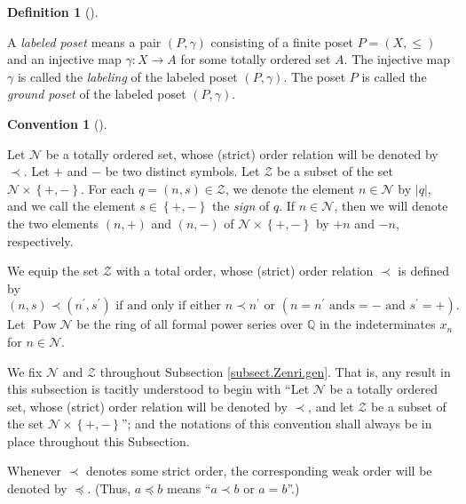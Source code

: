 \documentclass[numbers=enddot,12pt,final,onecolumn,notitlepage]{scrartcl}%
\theoremstyle{definition}
\newtheorem{defi}[theo]{Definition}
\newenvironment{definition}[1][]
{\begin{defi}[#1]\begin{leftbar}}
{\end{leftbar}\end{defi}}
\newtheorem{conv}[theo]{Convention}
\newenvironment{convention}[1][]
{\begin{conv}[#1]\begin{leftbar}}
{\end{leftbar}\end{conv}}
\newenvironment{convention}[1][Convention]{\noindent\textbf{#1.} }{\ \rule{0.5em}{0.5em}}
\begin{document}
\begin{definition}
A \textit{labeled poset} means a pair $\left(  P,\gamma\right)  $ consisting
of a finite poset $P=\left(  X,\leq\right)  $ and an injective map
$\gamma:X\rightarrow A$ for some totally ordered set $A$. The injective map
$\gamma$ is called the \textit{labeling} of the labeled poset $\left(
P,\gamma\right)  $. The poset $P$ is called the \textit{ground poset} of the
labeled poset $\left(  P,\gamma\right)  $.
\end{definition}

\begin{convention}
Let $\mathcal{N}$ be a totally ordered set, whose (strict) order relation will
be denoted by $\prec$. Let $+$ and $-$ be two distinct symbols. Let
$\mathcal{Z}$ be a subset of the set $\mathcal{N}\times\left\{  +,-\right\}
$. For each $q=\left(  n,s\right)  \in\mathcal{Z}$, we denote the element
$n\in\mathcal{N}$ by $\left\vert q\right\vert $, and we call the element
$s\in\left\{  +,-\right\}  $ the \textit{sign} of $q$. If $n\in\mathcal{N}$,
then we will denote the two elements $\left(  n,+\right)  $ and $\left(
n,-\right)  $ of $\mathcal{N}\times\left\{  +,-\right\}  $ by $+n$ and $-n$, respectively.

We equip the set $\mathcal{Z}$ with a total order, whose (strict) order
relation $\prec$ is defined by%
\[
\left(  n,s\right)  \prec\left(  n^{\prime},s^{\prime}\right)  \text{ if and
only if either }n\prec n^{\prime}\text{ or }\left(  n=n^{\prime}\text{ and
}s=-\text{ and }s^{\prime}=+\right)  .
\]
Let $\operatorname*{Pow}\mathcal{N}$ be the ring of all formal power series
over $\mathbb{Q}$ in the indeterminates $x_{n}$ for $n\in\mathcal{N}$.

We fix $\mathcal{N}$ and $\mathcal{Z}$ throughout Subsection
\ref{subsect.Zenri.gen}. That is, any result in this subsection is tacitly
understood to begin with \textquotedblleft Let $\mathcal{N}$ be a totally
ordered set, whose (strict) order relation will be denoted by $\prec$, and let
$\mathcal{Z}$ be a subset of the set $\mathcal{N}\times\left\{  +,-\right\}
$\textquotedblright; and the notations of this convention shall always be
in place throughout this Subsection.

Whenever $\prec$ denotes some strict order, the corresponding weak order will
be denoted by $\preccurlyeq$. (Thus, $a \preccurlyeq b$ means ``$a \prec b$ or
$a = b$''.)
\end{convention}
\end{document}
